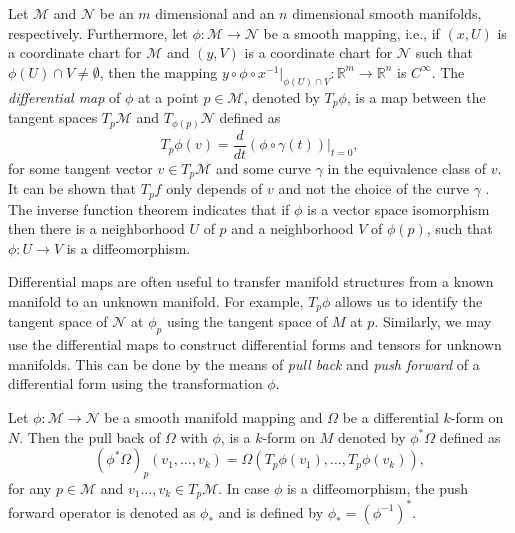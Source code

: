 Let $\mathcal M$ and $\mathcal N$ be an $m$ dimensional and an $n$ dimensional smooth manifolds, respectively. Furthermore, let $\phi:\mathcal M\to \mathcal N$ be a smooth mapping, i.e., if $(x,U)$ is a coordinate chart for $\mathcal M$ and $(y,V)$ is a coordinate chart for $\mathcal N$ such that $\phi(U)\cap V\neq \emptyset$, then the mapping $y\circ \phi \circ x^{-1}|_{\phi(U)\cap V}:\mathbb R^{m}\to \mathbb R^{n}$ is $C^{\infty}$. The \emph{differential map} of $\phi$ at a point $p\in \mathcal M$, denoted by $T_{p}\phi$, is a map between the tangent spaces $T_p \mathcal M$ and $T_{\phi(p)} \mathcal N$ defined as
\begin{equation} \label{eq:2.4}
	T_p \phi(v) = \frac{d}{dt}(\phi\circ \gamma(t))|_{t=0},
\end{equation}
for some tangent vector $v\in T_{p} \mathcal M$ and some curve $\gamma$ in the equivalence class of $v$. It can be shown that $T_p f$ only depends of $v$ and not the choice of the curve $\gamma$ \cite{robbin2011introduction}. The inverse function theorem \cite{rudin1976principles} indicates that if $\phi$ is a vector space isomorphism then there is a neighborhood $U$ of $p$ and a neighborhood $V$ of $\phi(p)$, such that $\phi:U\to V$ is a diffeomorphism.

Differential maps are often useful to transfer manifold structures from a known manifold to an unknown manifold. For example, $T_p\phi$ allows us to identify the tangent space of $\mathcal N$ at $\phi_p$ using the tangent space of $M$ at $p$. Similarly, we may use the differential maps to construct differential forms and tensors for unknown manifolds. This can be done by the means of \emph{pull back} and \emph{push forward} of a differential form using the transformation $\phi$.

\begin{definition}
Let $\phi:\mathcal M \to \mathcal N$ be a smooth manifold mapping and $\Omega$ be a differential $k$-form on $N$. Then the pull back of $\Omega$ with $\phi$, is a $k$-form on $M$ denoted by $\phi^*\Omega$ defined as
\[
	(\phi^*\Omega)_p(v_1,\dots,v_k) = \Omega( T_p\phi(v_1) , \dots , T_p\phi(v_k) ),
\]
for any $p\in \mathcal M$ and $v_1\dots,v_k \in T_p \mathcal M$. In case $\phi$ is a diffeomorphism, the push forward operator is denoted as $\phi_*$ and is defined by $\phi_* = (\phi^{-1})^*$.
\end{definition}
